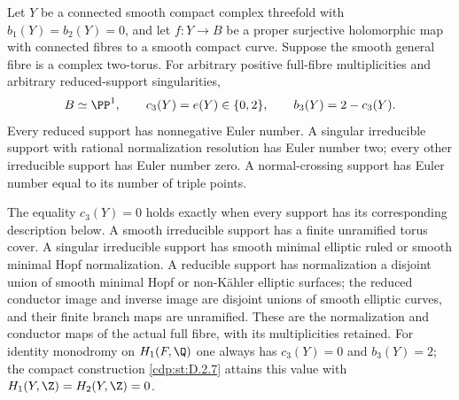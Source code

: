 \begin{maintheorem}
\hypertarget{tag-03K4}{}\label{series:II:C}

Let $Y$ be a connected smooth compact complex threefold with
$b_1(Y)=b_2(Y)=0$, and let $f:Y\to B$ be a proper surjective
holomorphic map with connected fibres to a smooth compact curve.
Suppose the smooth general fibre is a complex two-torus. For
arbitrary positive full-fibre multiplicities and arbitrary
reduced-support singularities,
\[
 B\simeq\PP^1,\qquad
 c_3(Y)=e(Y)\in\{0,2\},\qquad b_3(Y)=2-c_3(Y).
\]
Every reduced support has nonnegative Euler number. A singular
irreducible support with rational normalization resolution has
Euler number two; every other irreducible support has Euler
number zero. A normal-crossing support has Euler number equal
to its number of triple points.

The equality $c_3(Y)=0$ holds exactly when every support has its
corresponding description below. A smooth irreducible support
has a finite unramified torus cover. A singular irreducible support
has smooth minimal elliptic ruled or smooth minimal Hopf
normalization. A reducible support has normalization a disjoint
union of smooth minimal Hopf or non-K\"ahler elliptic surfaces;
the reduced conductor image and inverse image are disjoint unions
of smooth elliptic curves, and their finite branch maps are
unramified. These are the normalization and conductor maps of
the actual full fibre, with its multiplicities retained.
For identity monodromy on $H_1(F,\Q)$ one always has
$c_3(Y)=0$ and $b_3(Y)=2$; the compact construction
\ref{cdp:st:D.2.7} attains this value with
$H_1(Y,\Z)=H_2(Y,\Z)=0$.

\end{maintheorem}

